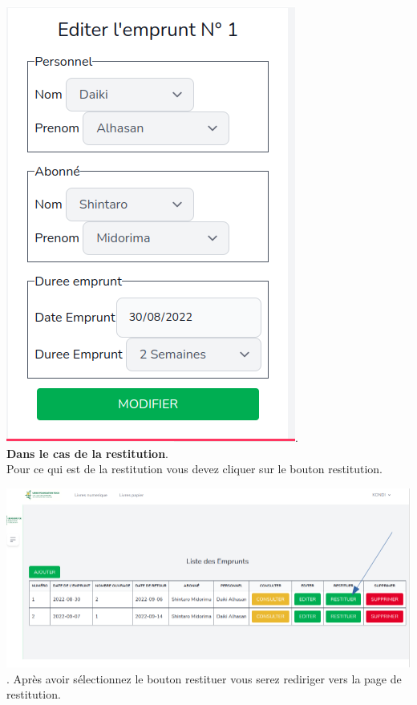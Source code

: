 \documentclass[12pt,a4paper]{article}
\begin{document}
\includegraphics[scale=0.5]{images/EmpruntEdit.png}.\\

\textbf{Dans le cas de la restitution}.\\
Pour ce qui est de la restitution vous devez cliquer sur le bouton restitution.

\includegraphics[scale=0.5]{images/RestitutionSectionner.png}.
\newpage
Après avoir sélectionnez le bouton restituer vous serez rediriger vers la page de restitution.\\
\end{document}
